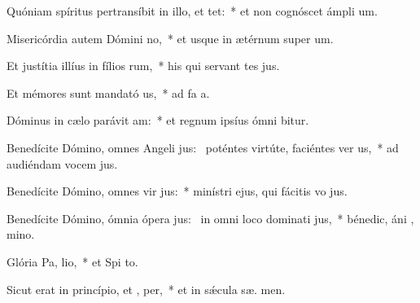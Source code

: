 \item Quóniam spíritus pertransíbit in illo, et  tet:~* et non cognóscet ámpli  um.
\item Misericórdia autem Dómini  no,~* et usque in ætérnum super  um.
\item Et justítia illíus in fílios rum,~* his qui servant tes jus.
\item Et mémores sunt mandató us,~* ad fa a.
\item Dóminus in cælo parávit  am:~* et regnum ipsíus ómni bitur.
\item Benedícite Dómino, omnes Angeli jus:~\pscross{} poténtes virtúte, faciéntes ver us,~* ad audiéndam vocem  jus.
\item Benedícite Dómino, omnes vir jus:~* minístri ejus, qui fácitis vo jus.
\item Benedícite Dómino, ómnia ópera jus:~\pscross{} in omni loco dominati jus,~* bénedic, áni , mino.
\item Glória Pa,  lio,~* et Spi to.
\item Sicut erat in princípio, et ,  per,~* et in sǽcula sæ. men.
